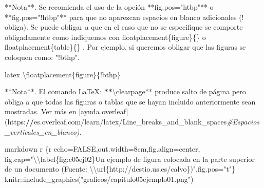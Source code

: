 \documentclass[11pt,a4paper,oneside,]{article}
\newenvironment{Shaded}{\begin{snugshade}}{\end{snugshade}}
\newcommand{\AttributeTok}[1]{\textcolor[rgb]{0.77,0.63,0.00}{#1}}
\newcommand{\CommentTok}[1]{\textcolor[rgb]{0.56,0.35,0.01}{\textit{#1}}}
\newcommand{\ErrorTok}[1]{\textcolor[rgb]{0.64,0.00,0.00}{\textbf{#1}}}
\newcommand{\FunctionTok}[1]{\textcolor[rgb]{0.00,0.00,0.00}{#1}}
\newcommand{\NormalTok}[1]{#1}
\newcommand{\SpecialCharTok}[1]{\textcolor[rgb]{0.00,0.00,0.00}{#1}}
\newcommand{\StringTok}[1]{\textcolor[rgb]{0.31,0.60,0.02}{#1}}
\numberwithin{dummy}{section}
\theoremstyle{ocrenumbox}
\theoremstyle{blacknumex}
\theoremstyle{blacknumbox}
\theoremstyle{ocrenum}
\theoremstyle{ocrenum}
\begin{document}
\begin{Shaded}
\begin{Highlighting}[numbers=left,,]
\SpecialCharTok{**}\NormalTok{Nota}\SpecialCharTok{**}\NormalTok{. Se recomienda el uso de la opción }\SpecialCharTok{**}\StringTok{\textasciigrave{}}\AttributeTok{fig.pos="htbp"}\StringTok{\textasciigrave{}}\SpecialCharTok{**}\NormalTok{ o }\SpecialCharTok{**}\StringTok{\textasciigrave{}}\AttributeTok{fig.pos="!htbp"}\StringTok{\textasciigrave{}}\SpecialCharTok{**}\NormalTok{ para que no aparezcan espacios en blanco }\FunctionTok{adicionales}\NormalTok{ (}\StringTok{\textasciigrave{}}\AttributeTok{!}\StringTok{\textasciigrave{}}\NormalTok{ obliga). Se puede obligar a que en el caso que no se especifique se comporte obligadamente como indiquemos con }\StringTok{\textasciigrave{}}\AttributeTok{floatplacement\{figure\}\{\}}\StringTok{\textasciigrave{}}\NormalTok{ o }\StringTok{\textasciigrave{}}\AttributeTok{floatplacement\{table\}\{\}}\StringTok{\textasciigrave{}}\NormalTok{ . Por ejemplo, si queremos obligar que las figuras se coloquen como}\SpecialCharTok{:} \StringTok{"!bthp"}\NormalTok{.}

\StringTok{\textasciigrave{}\textasciigrave{}\textasciigrave{}}\AttributeTok{latex}
\SpecialCharTok{\textbackslash{}f}\AttributeTok{loatplacement\{figure\}\{!bthp\}}
\StringTok{\textasciigrave{}\textasciigrave{}\textasciigrave{}}


\SpecialCharTok{**}\NormalTok{Nota}\SpecialCharTok{**}\NormalTok{. El comando LaTeX}\SpecialCharTok{:} \ErrorTok{**}\StringTok{\textasciigrave{}}\AttributeTok{\textbackslash{}clearpage}\StringTok{\textasciigrave{}}\SpecialCharTok{**}\NormalTok{ produce salto de página pero obliga a que todas las figuras o tablas que se hayan incluido anteriormente sean mostradas.}
\NormalTok{Ver más en [ayuda overleaf](https}\SpecialCharTok{:}\ErrorTok{//}\NormalTok{es.overleaf.com}\SpecialCharTok{/}\NormalTok{learn}\SpecialCharTok{/}\NormalTok{latex}\SpecialCharTok{/}\NormalTok{Line\_breaks\_and\_blank\_spaces}\CommentTok{\#Espacios\_verticales\_en\_blanco).}

\StringTok{\textasciigrave{}\textasciigrave{}\textasciigrave{}\textasciigrave{}}\NormalTok{markdown}
\StringTok{\textasciigrave{}}\AttributeTok{r \textquotesingle{}\textquotesingle{}}\StringTok{\textasciigrave{}\textasciigrave{}\textasciigrave{}\textasciigrave{}}\AttributeTok{\{r echo=FALSE,out.width=\textquotesingle{}8cm\textquotesingle{},fig.align=\textquotesingle{}center\textquotesingle{},}
\AttributeTok{fig.cap="}\SpecialCharTok{\textbackslash{}\textbackslash{}}\AttributeTok{label\{fig:c05ej02\}Un ejemplo de figura colocada }
\AttributeTok{en la parte superior de un documento }
\AttributeTok{(Fuente: }\SpecialCharTok{\textbackslash{}\textbackslash{}}\AttributeTok{url\{http://destio.us.es/calvo\})",fig.pos="t"\}}
\AttributeTok{knitr::include\_graphics("graficos/capitulo05ejemplo01.png")}
\StringTok{\textasciigrave{}\textasciigrave{}\textasciigrave{}}
\StringTok{\textasciigrave{}\textasciigrave{}\textasciigrave{}\textasciigrave{}}


\end{Highlighting}
\end{Shaded}
\end{document}
